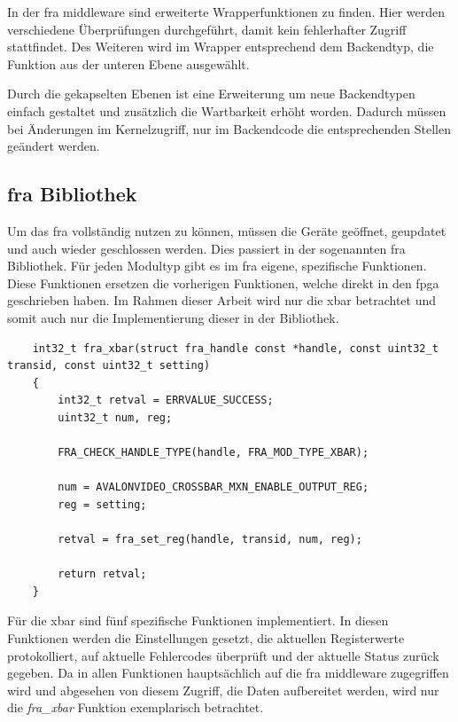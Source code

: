 In der \ac{fra} \gls{middleware} sind erweiterte Wrapperfunktionen zu finden. Hier werden verschiedene Überprüfungen durchgeführt, damit kein fehlerhafter Zugriff stattfindet. Des Weiteren wird im Wrapper entsprechend dem Backendtyp, die Funktion aus der unteren Ebene ausgewählt. 


Durch die gekapselten Ebenen ist eine Erweiterung um neue Backendtypen einfach gestaltet und zusätzlich die Wartbarkeit erhöht worden. 
Dadurch müssen bei Änderungen im Kernelzugriff, nur im Backendcode die entsprechenden Stellen geändert werden.\\

\subsection{\acs{fra} Bibliothek}
Um das \ac{fra} vollständig nutzen zu können, müssen die Geräte geöffnet, geupdatet und auch wieder geschlossen werden. Dies passiert in der sogenannten \ac{fra} Bibliothek. 
Für jeden Modultyp gibt es im \ac{fra} eigene, spezifische Funktionen. Diese Funktionen ersetzen die vorherigen Funktionen, welche direkt in den \ac{fpga} geschrieben haben. Im Rahmen dieser Arbeit wird nur die \ac{xbar} betrachtet und somit auch nur die Implementierung dieser in der Bibliothek.

\begin{lstfloat}
	\begin{lstlisting}
	int32_t fra_xbar(struct fra_handle const *handle, const uint32_t transid, const uint32_t setting)
	{
		int32_t retval = ERRVALUE_SUCCESS;
		uint32_t num, reg;
		
		FRA_CHECK_HANDLE_TYPE(handle, FRA_MOD_TYPE_XBAR);
		
		num = AVALONVIDEO_CROSSBAR_MXN_ENABLE_OUTPUT_REG;
		reg = setting;
		
		retval = fra_set_reg(handle, transid, num, reg);  
		
		return retval;
	}
	\end{lstlisting}
\end{lstfloat}

Für die \ac{xbar} sind fünf spezifische Funktionen implementiert. In diesen Funktionen werden die Einstellungen gesetzt, die aktuellen Registerwerte protokolliert, auf aktuelle Fehlercodes überprüft und der aktuelle Status zurück gegeben. Da in allen Funktionen hauptsächlich auf die \ac{fra} \gls{middleware} zugegriffen wird und abgesehen von diesem Zugriff, die Daten aufbereitet werden, wird nur die \textit{fra\_xbar} Funktion exemplarisch betrachtet.\\

